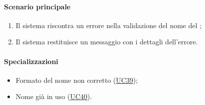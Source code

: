 \paragraph*{Scenario principale}
\begin{enumerate}
  \item Il sistema riscontra un errore nella validazione del nome del ;
  \item Il sistema restituisce un messaggio con i dettagli dell'errore.  
\end{enumerate}

\paragraph*{Specializzazioni}
\begin{itemize}
  \item Formato del nome non corretto (\hyperref[UC39]{UC39});
  \item Nome già in uso (\hyperref[UC40]{UC40}).
\end{itemize}
